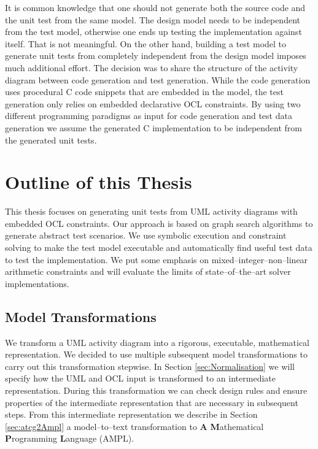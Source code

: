 It is common knowledge that one should not generate both the source code and the unit test from the same model. The design model needs to be independent from the test model, otherwise one ends up testing the implementation against itself. That is not meaningful. %
On the other hand, building a test model to generate unit tests from completely independent from the design model imposes much additional effort. The decision was to share the structure of the activity diagram between code generation and test generation. While the code generation uses procedural C code snippets that are embedded in the model, the test generation only relies on embedded declarative OCL constraints. By using two different programming paradigms as input for code generation and test data generation we assume the generated C implementation to be independent from the generated unit tests.
\section{Outline of this Thesis}
This thesis focuses on generating unit tests from UML activity diagrams with embedded OCL constraints. Our approach is based on graph search algorithms to generate abstract test scenarios. We use symbolic execution and constraint solving to make the test model executable and automatically find useful test data to test the implementation. We put some emphasis on mixed--integer--non--linear arithmetic constraints and will evaluate the limits of state--of--the--art solver implementations.
\subsection{Model Transformations}
We transform a UML activity diagram into a rigorous, executable, mathematical representation. We decided to use multiple subsequent model transformations to carry out this transformation stepwise. In Section \ref{sec:Normalisation} we will specify how the UML and OCL input is transformed to an intermediate representation. During this transformation we can check design rules and ensure properties of the intermediate representation that are necessary in subsequent steps. From this intermediate representation we describe in Section \ref{sec:atcg2Ampl} a model--to--text transformation to \textbf{A} \textbf{M}athematical \textbf{P}rogramming \textbf{L}anguage (AMPL).
